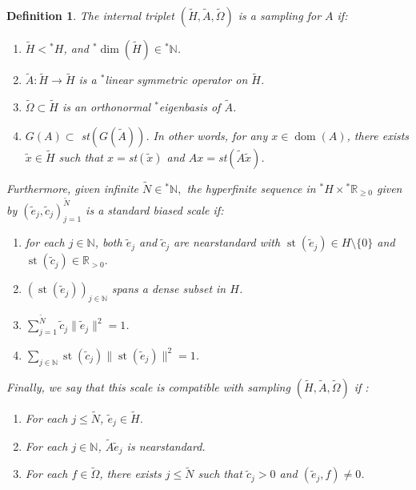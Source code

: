\documentclass[10pt,a4paper]{amsart}
\newtheorem{defn}[thm]{Definition}
\def \St{\operatorname{st}}
\newcounter{pointnumber}
\begin{document}
\begin{defn}\label{definition_nonstandard_sampling}
		The internal triplet $(\tilde{H},\tilde{A},\tilde{\Omega})$ is a sampling for $A$ if:
	
	\begin{enumerate}
		\item \label{property_nonstandard_dimension} $\tilde{H}<{}^*H$, and ${}^*\operatorname{dim}(\tilde{H})\in{}^*\mathbb{N}$. 
		\item \label{property_nonstandard_symmetric} $\tilde{A}:\tilde{H}\rightarrow\tilde{H}$ is a ${}^*$linear symmetric operator on $\tilde{H}$.
		\item \label{property_nonstandard_eigenbasis} $\tilde{\Omega}\subset\tilde{H}$ is an orthonormal ${}^*$eigenbasis of $\tilde{A}$.
		
		\item \label{property_nonstandard_approximation} $G(A)\subset$ st$(G(\tilde{A}))$. In other words, for any $x\in \operatorname{dom}(A)$, there exists $\tilde{x}\in \tilde{H}$ such that $x=$st$(\tilde{x})$ and $Ax=$st$(\tilde{A}\tilde{x})$.
		\setcounter{pointnumber}{\value{enumi}}
	\end{enumerate}
	
	Furthermore, given infinite $\tilde{N}\in{}^*\mathbb{N},$ the hyperfinite sequence in ${}^*H\times {}^*\mathbb{R}_{\geq0}$ given by $(\tilde{e}_j,\tilde{c}_j)_{j=1}^{\tilde{N}}$ is a standard biased scale if:
	
	\begin{enumerate}
		\setcounter{enumi}{\value{pointnumber}}
		\item\label{property_nonstandard_scale_NS} for each $j\in\mathbb{N}$, both $\tilde{e}_j$ and $\tilde{c}_j$ are nearstandard with $\St(\tilde{e}_j)\in H\setminus\{0\}$ and $\St(\tilde{c}_j)\in\mathbb{R}_{>0}.$
		\item\label{property_nonstandard_scale_dense} $(\St(\tilde{e}_j))_{j\in\mathbb{N}}$ spans a dense subset in $H$.
		\item \label{property_nonstandard_scale_proba} $\sum_{j=1}^{\tilde{N}}\tilde{c}_j\|\tilde{e}_j\|^2=1$.
		\item \label{property_nonstandard_scale_bias} $\sum_{j\in\mathbb{N}}\St(\tilde{c}_j)\|\St(\tilde{e}_j)\|^2=1$.
		
		\setcounter{pointnumber}{\value{enumi}}
	\end{enumerate}
	
	Finally, we say that this scale is compatible with sampling $(\tilde{H},\tilde{A},\tilde{\Omega})$ if :
	\begin{enumerate}
		\setcounter{enumi}{\value{pointnumber}}
		\item \label{property_nonstandard_compat_H} For each $j\leq\tilde{N}$, $\tilde{e}_j\in\tilde{H}$.
		\item \label{property_nonstandard_compat_A} For each $j\in \mathbb{N}$, $\tilde{A}\tilde{e}_j$ is nearstandard.
		\item \label{property_nonstandard_compat_Omega} For each $f\in\tilde{\Omega}$, there exists $j\leq\tilde{N}$ such that $\tilde{c}_j>0$ and $(\tilde{e}_j,f)\neq0$.
	\end{enumerate}
\end{defn}
\end{document}
